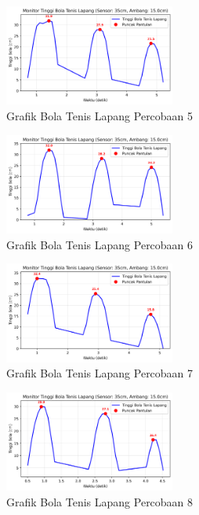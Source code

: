 \begin{figure}[htbp]
    \centering
    \includegraphics[width=0.5\textwidth]{chapters/DataPercobaan/Grafik_Bola_Tenis_Lapang_5.png}
    \caption{Grafik Bola Tenis Lapang Percobaan 5}
\end{figure}
\begin{figure}[htbp]
    \centering
    \includegraphics[width=0.5\textwidth]{chapters/DataPercobaan/Grafik_Bola_Tenis_Lapang_6.png}
    \caption{Grafik Bola Tenis Lapang Percobaan 6}
\end{figure}
\begin{figure}[htbp]
    \centering
    \includegraphics[width=0.5\textwidth]{chapters/DataPercobaan/Grafik_Bola_Tenis_Lapang_7.png}
    \caption{Grafik Bola Tenis Lapang Percobaan 7}
\end{figure}
\begin{figure}[htbp]
    \centering
    \includegraphics[width=0.5\textwidth]{chapters/DataPercobaan/Grafik_Bola_Tenis_Lapang_8.png}
    \caption{Grafik Bola Tenis Lapang Percobaan 8}
\end{figure}
